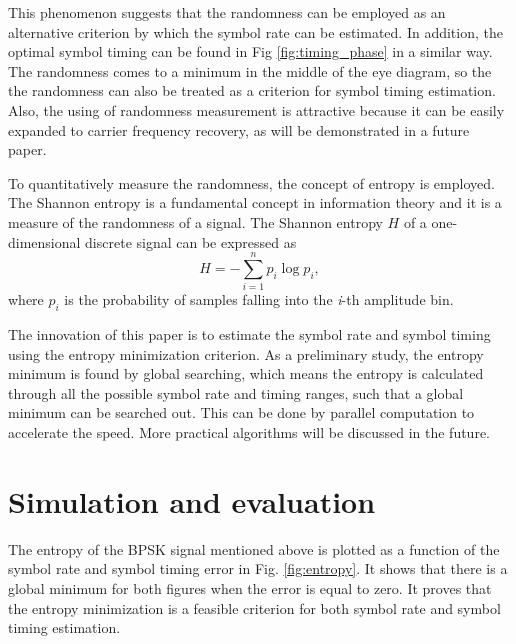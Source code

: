 \documentclass[conference, onecolumn]{IEEEtran}
\begin{document}
This phenomenon suggests that the randomness can be employed as an alternative criterion by which the symbol rate can be estimated.
In addition, the optimal symbol timing can be found in Fig \ref{fig:timing_phase} in a similar way. 
The randomness comes to a minimum in the middle of the eye diagram, 
so the the randomness can also be treated as a criterion for symbol timing estimation.
Also, the using of randomness measurement is attractive because it can be easily expanded to carrier frequency recovery, as will be demonstrated in a future paper.

To quantitatively measure the randomness, the concept of entropy is employed.
The Shannon entropy \cite{Shannon1948} is a fundamental concept in information theory and it is a measure of the randomness of a signal.
The Shannon entropy \(H\) of a one-dimensional discrete signal can be expressed as
\begin{equation}
H =  - \sum\limits_{i = 1}^n {{p_i}\log {p_i}},
\label{eq:entropy}
\end{equation}
where \(p_i\) is the probability of samples falling into the \textit{i}-th amplitude bin.

The innovation of this paper is to estimate the symbol rate and symbol timing using the entropy minimization criterion.
As a preliminary study, the entropy minimum is found by global searching,
which means the entropy is calculated through all the possible symbol rate and timing ranges, such that a global minimum can be searched out.
This can be done by parallel computation to accelerate the speed.
More practical algorithms will be discussed in the future.

\section{Simulation and evaluation}

The entropy of the BPSK signal mentioned above is plotted as a function of the symbol rate and symbol timing error in Fig. \ref{fig:entropy}.
It shows that there is a global minimum for both figures when the error is equal to zero.
It proves that the entropy minimization is a feasible criterion for both symbol rate and symbol timing estimation.
\end{document}

